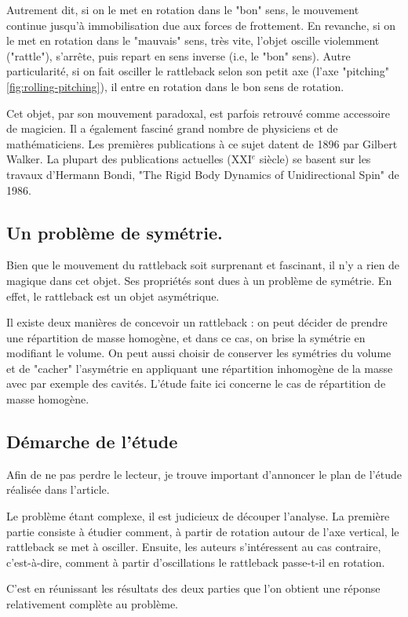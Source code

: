 \documentclass[12pt,a4paper]{article}
\begin{document}
	Autrement dit, si on le met en rotation dans le "bon" sens, le mouvement continue jusqu'à immobilisation due aux forces de frottement. En revanche, si on le met en rotation dans le "mauvais" sens, très vite, l'objet oscille violemment ("rattle"), s'arrête, puis repart en sens inverse (i.e, le "bon" sens). Autre particularité, si on fait osciller le rattleback selon son petit axe (l'axe "pitching" \autoref{fig:rolling-pitching}), il entre en rotation dans le bon sens de rotation.
	
	Cet objet, par son mouvement paradoxal, est parfois retrouvé comme accessoire de magicien.
	Il a également fasciné grand nombre de physiciens et de mathématiciens. Les premières publications à ce sujet datent de 1896 par Gilbert Walker. La plupart des publications actuelles (XXI$^{e}$ siècle) se basent sur les travaux d'Hermann Bondi, "The Rigid Body Dynamics of Unidirectional Spin" de 1986.
	\subsection{Un problème de symétrie.}
	Bien que le mouvement du rattleback soit surprenant et fascinant, il n'y a rien de magique dans cet objet. Ses propriétés sont dues à un problème de symétrie. En effet, le rattleback est un objet asymétrique.
	
	Il existe deux manières de concevoir un rattleback : on peut décider de prendre une répartition de masse homogène, et dans ce cas, on brise la symétrie en modifiant le volume. On peut aussi choisir de conserver les symétries du volume et de "cacher" l'asymétrie en appliquant une répartition inhomogène de la masse avec par exemple des cavités. L'étude faite ici concerne le cas de répartition de masse homogène.
	
	\subsection{Démarche de l'étude}
	Afin de ne pas perdre le lecteur, je trouve important d'annoncer le plan de l'étude réalisée dans l'article.
	
	Le problème étant complexe, il est judicieux de découper l'analyse.
	La première partie consiste à étudier comment, à partir de rotation autour de l'axe vertical, le rattleback se met à osciller.
	Ensuite, les auteurs s'intéressent au cas contraire, c'est-à-dire, comment à partir d'oscillations le rattleback passe-t-il en rotation.
	
	C'est en réunissant les résultats des deux parties que l'on obtient une réponse relativement complète au problème.
	
\end{document}
